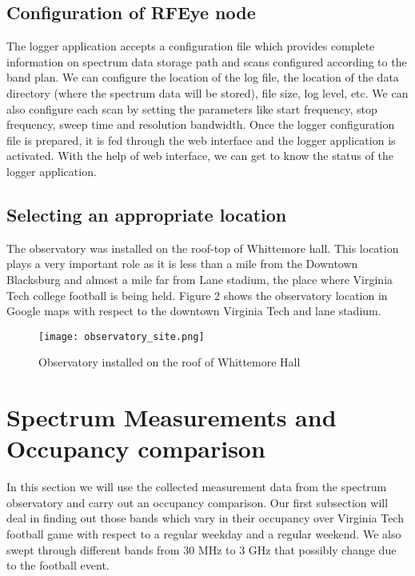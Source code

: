 \documentclass[12pt,sts]{report}
\begin{document}
\subsection{Configuration of RFEye node}
	
	The logger application accepts a configuration file which provides complete information on spectrum data storage path and scans configured according to the band plan. We can configure the location of the log file, the location of the data directory (where the spectrum data will be stored), file size, log level, etc. We can also configure each scan by setting the parameters like start frequency, stop frequency, sweep time and resolution bandwidth. Once the logger configuration file is prepared, it is fed through the web interface and the logger application is activated. With the help of web interface, we can get to know the status of the logger application.

\subsection{Selecting an appropriate location}
	
	The observatory was installed on the roof-top of Whittemore hall. This location plays a very important role as it is less than a mile from the Downtown Blacksburg and almost a mile far from Lane stadium, the place where Virginia Tech college football is being held. Figure 2 shows the observatory location in Google maps with respect to the downtown Virginia Tech and lane stadium.
	
	\begin{figure}[ht!]
  \centering
    \texttt{[image: observatory\_site.png]}
		\caption{Observatory installed on the roof of Whittemore Hall}
	\end{figure}

\pagebreak


\section{Spectrum Measurements and Occupancy comparison}

In this section we will use the collected measurement data from the spectrum observatory and carry out an occupancy comparison. Our first subsection will deal in finding out those bands which vary in their occupancy over Virginia Tech football game with respect to a regular weekday and a regular weekend. We also swept through different bands from 30 MHz to 3 GHz that possibly change due to the football event.
\end{document}
